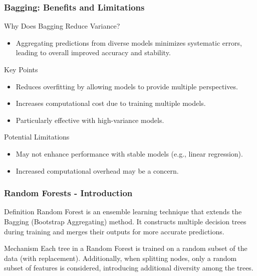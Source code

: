 \documentclass[aspectratio=169]{beamer}
\begin{document}
\begin{frame}[fragile]
    \frametitle{Bagging: Benefits and Limitations}
    \begin{block}{Why Does Bagging Reduce Variance?}
        \begin{itemize}
            \item Aggregating predictions from diverse models minimizes systematic errors, leading to overall improved accuracy and stability.
        \end{itemize}
    \end{block}

    \begin{block}{Key Points}
        \begin{itemize}
            \item Reduces overfitting by allowing models to provide multiple perspectives.
            \item Increases computational cost due to training multiple models.
            \item Particularly effective with high-variance models.
        \end{itemize}
    \end{block}

    \begin{block}{Potential Limitations}
        \begin{itemize}
            \item May not enhance performance with stable models (e.g., linear regression).
            \item Increased computational overhead may be a concern.
        \end{itemize}
    \end{block}
\end{frame}

\begin{frame}[fragile]
    \frametitle{Random Forests - Introduction}
    \begin{block}{Definition}
        Random Forest is an ensemble learning technique that extends the Bagging (Bootstrap Aggregating) method. It constructs multiple decision trees during training and merges their outputs for more accurate predictions.
    \end{block}
    
    \begin{block}{Mechanism}
        Each tree in a Random Forest is trained on a random subset of the data (with replacement). Additionally, when splitting nodes, only a random subset of features is considered, introducing additional diversity among the trees.
    \end{block}
\end{frame}
\end{document}
